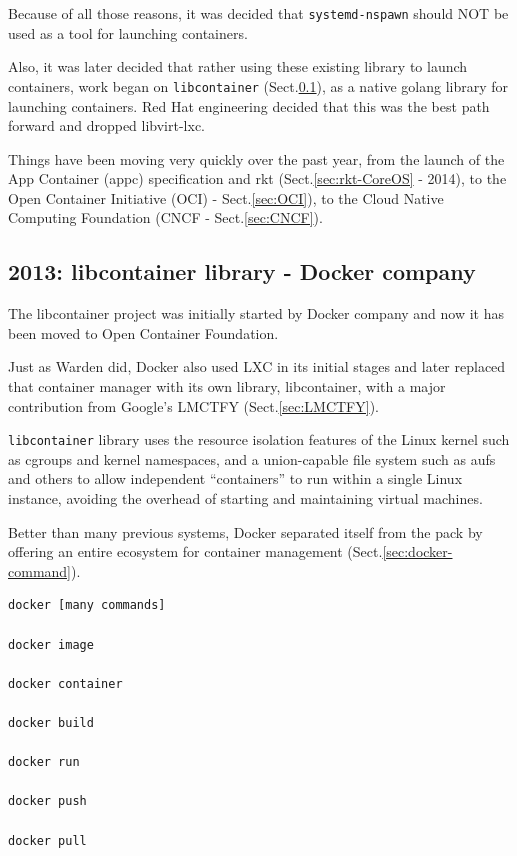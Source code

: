 Because of all those reasons, it was decided that \verb!systemd-nspawn! should
NOT be used as a tool for launching containers.

Also, it was later decided that rather using these existing library to launch
containers, work began on \verb!libcontainer!
(Sect.\ref{sec:libcontainer-library}), as a native golang library for launching
containers. Red Hat engineering decided that this was the best path forward and
dropped libvirt-lxc.

Things have been moving very quickly over the past year, from the launch of the
App Container (appc) specification and rkt (Sect.\ref{sec:rkt-CoreOS} - 2014),
to the Open Container Initiative (OCI) - Sect.\ref{sec:OCI}), to the Cloud
Native Computing Foundation (CNCF - Sect.\ref{sec:CNCF}).


\subsection{2013: libcontainer library - Docker company}
\label{sec:libcontainer-library}
\label{sec:Docker-company}
\label{sec:Docker}

The libcontainer project was initially started by Docker company and now it has
been moved to Open Container Foundation.

\begin{mdframed}

Just as Warden did, Docker also used LXC in its initial stages and later
replaced that container manager with its own library, libcontainer, with a major
contribution from Google's LMCTFY (Sect.\ref{sec:LMCTFY}).
\end{mdframed}

\verb!libcontainer! library  uses the resource isolation features of the Linux
kernel such as cgroups and kernel namespaces, and a union-capable file system
such as aufs and others to allow independent “containers” to run within a single
Linux instance, avoiding the overhead of starting and maintaining virtual
machines.


Better than many previous systems, Docker separated itself from the pack by
offering an entire ecosystem for container management (Sect.\ref{sec:docker-command}).
\begin{verbatim}
docker [many commands]

docker image

docker container

docker build

docker run

docker push

docker pull

\end{verbatim}

